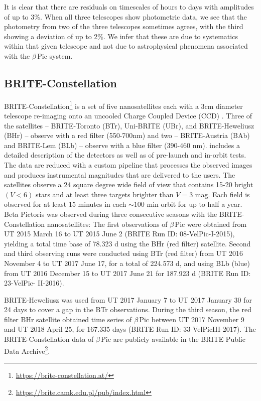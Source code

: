 \documentclass[longauth]{aa} %
\newcommand{\bp}{$\beta$\,Pic}
\begin{document}
It is clear that there are residuals on timescales of hours to days with amplitudes of up to 3\%.
%
When all three telescopes show photometric data, we see that the photometry from two of the three telescopes sometimes agrees, with the third showing a deviation of up to 2\%.
%
We infer that these are due to systematics within that given telescope and not due to astrophysical phenomena associated with the \bp{} system.

\subsection{BRITE-Constellation}

BRITE-Constellation\footnote{\url{https://brite-constellation.at/}} is a set of five nanosatellites each with a 3cm diameter telescope re-imaging onto an uncooled Charge Coupled Device (CCD) \citep{Weiss14}.
%
Three of the satellites -- BRITE-Toronto (BTr), Uni-BRITE (UBr), and BRITE-Heweliusz (BHr) -- observe with a red filter (550-700nm) and two -- BRITE-Austria (BAb) and BRITE-Lem (BLb) --  observe with a blue filter (390-460 nm). \citet{pablo2016} includes a detailed description of the detectors as well as of pre-launch and in-orbit tests.
The data are reduced with a custom pipeline \citep{Popowicz17} that processes the observed images and produces instrumental magnitudes that are delivered to the users.
%
The satellites observe a 24 square degree wide field of view that contains 15-20 bright $(V<6)$ stars and at least three targets brighter than $V=3$ mag. Each field is observed for at least 15 minutes in each $\sim 100$ min orbit for up to half a year.
%
Beta Pictoris was observed during three consecutive seasons with the BRITE-Constellation nanosatellites:
The first observations of \bp{} were obtained
from UT 2015 March 16 to UT 2015 June 2 (BRITE Run ID: 08-VelPic-I-2015), yielding a total time base of 78.323 d using the BHr (red filter) satellite.
%
Second and third observing runs were conducted using BTr (red filter) from
UT 2016 November 4 to UT 2017 June 17,
for a total of 224.573 d, and using BLb (blue) from
UT 2016 December 15 to UT 2017 June 21 for 187.923 d
(BRITE Run ID: 23-VelPic- II-2016).

BRITE-Heweliusz was used from UT 2017 January 7 to UT 2017 January 30
for 24 days to cover a gap in the BTr observations.
%
During the third season, the red filter BHr satellite obtained time series of \bp{} between
UT 2017 November 9 and UT 2018 April 25, for 167.335 days
(BRITE Run ID: 33-VelPicIII-2017).
%
The BRITE-Constellation data of \bp{} are publicly available in the BRITE Public Data Archive\footnote{\url{https://brite.camk.edu.pl/pub/index.html}}.
%
\end{document}
